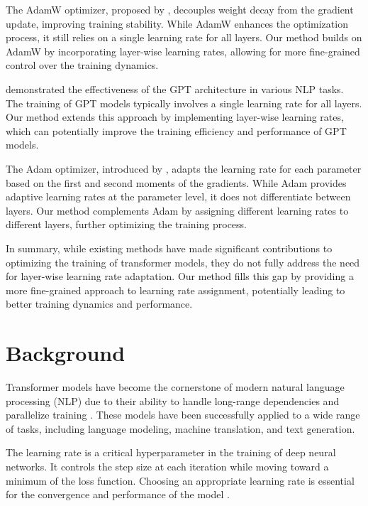 \documentclass{article} %
\begin{document}
The AdamW optimizer, proposed by \citet{loshchilov2017adamw}, decouples weight decay from the gradient update, improving training stability. While AdamW enhances the optimization process, it still relies on a single learning rate for all layers. Our method builds on AdamW by incorporating layer-wise learning rates, allowing for more fine-grained control over the training dynamics.

\citet{radford2019language} demonstrated the effectiveness of the GPT architecture in various NLP tasks. The training of GPT models typically involves a single learning rate for all layers. Our method extends this approach by implementing layer-wise learning rates, which can potentially improve the training efficiency and performance of GPT models.

The Adam optimizer, introduced by \citet{kingma2014adam}, adapts the learning rate for each parameter based on the first and second moments of the gradients. While Adam provides adaptive learning rates at the parameter level, it does not differentiate between layers. Our method complements Adam by assigning different learning rates to different layers, further optimizing the training process.

In summary, while existing methods have made significant contributions to optimizing the training of transformer models, they do not fully address the need for layer-wise learning rate adaptation. Our method fills this gap by providing a more fine-grained approach to learning rate assignment, potentially leading to better training dynamics and performance.

\section{Background}
\label{sec:background}

Transformer models have become the cornerstone of modern natural language processing (NLP) due to their ability to handle long-range dependencies and parallelize training \citep{vaswani2017attention}. These models have been successfully applied to a wide range of tasks, including language modeling, machine translation, and text generation.

The learning rate is a critical hyperparameter in the training of deep neural networks. It controls the step size at each iteration while moving toward a minimum of the loss function. Choosing an appropriate learning rate is essential for the convergence and performance of the model \citep{kingma2014adam}.
\end{document}
